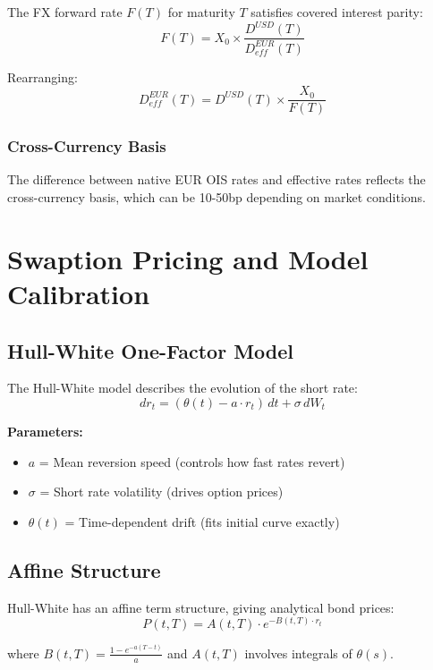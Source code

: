 \documentclass[10pt,a4paper]{article}
\begin{document}
The FX forward rate $F(T)$ for maturity $T$ satisfies covered interest parity:
\[
F(T) = X_0 \times \frac{D^{USD}(T)}{D^{EUR}_{eff}(T)}
\]

Rearranging:
\[
D^{EUR}_{eff}(T) = D^{USD}(T) \times \frac{X_0}{F(T)}
\]

\subsubsection{Cross-Currency Basis}

The difference between native EUR OIS rates and effective rates reflects the cross-currency basis, which can be 10-50bp depending on market conditions.

\newpage

\section{Swaption Pricing and Model Calibration}

\subsection{Hull-White One-Factor Model}

The Hull-White model describes the evolution of the short rate:
\[
dr_t = (\theta(t) - a \cdot r_t)\,dt + \sigma\,dW_t
\]

\textbf{Parameters:}
\begin{itemize}
    \item $a$ = Mean reversion speed (controls how fast rates revert)
    \item $\sigma$ = Short rate volatility (drives option prices)
    \item $\theta(t)$ = Time-dependent drift (fits initial curve exactly)
\end{itemize}

\subsection{Affine Structure}

Hull-White has an affine term structure, giving analytical bond prices:
\[
P(t,T) = A(t,T) \cdot e^{-B(t,T) \cdot r_t}
\]

where $B(t,T) = \frac{1-e^{-a(T-t)}}{a}$ and $A(t,T)$ involves integrals of $\theta(s)$.
\end{document}
